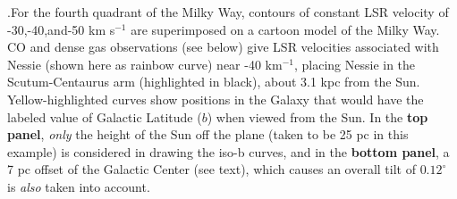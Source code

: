 \textbf{\label{fig:topview}}.For the fourth quadrant of the Milky Way, contours of constant LSR velocity of -30,-40,and-50 km s$^{-1}$ \citep[using a rotation curve from][ ]{McClureGriffiths2007} are superimposed on a cartoon model of the Milky Way. CO and dense gas observations (see below) give LSR velocities associated with Nessie (shown here as rainbow curve) near -40 km$^{-1}$, placing Nessie in the Scutum-Centaurus arm (highlighted in black), about 3.1 kpc from the Sun. Yellow-highlighted curves show positions in the Galaxy that would have the labeled value of Galactic Latitude ($b$) when viewed from the Sun.  In the \textbf{top panel}, \textit{only} the height of the Sun off the plane (taken to be 25 pc in this example) is considered in drawing the iso-b curves, and in the \textbf{bottom panel}, a 7 pc offset of the Galactic Center (see text), which causes an overall tilt of $0.12^\circ$ is \textit{also} taken into account. 